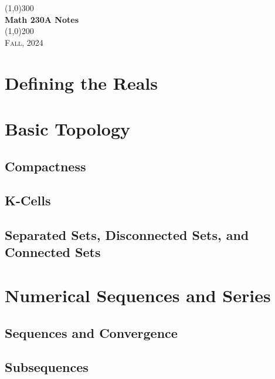 \documentclass[a4paper, openany]{book}
\begin{document}
\begin{titlepage}
    \begin{center}
        \line(1,0){300} \\
        [0.25in]
        \huge{\bfseries Math 230A Notes} \\
        [2mm]
        \line(1,0){200} \\
        [1.5cm]
        \textsc{\LARGE Fall, 2024}
    \end{center}
\end{titlepage}

\tableofcontents
\setcounter{section}{0}

\chapter{Defining the Reals}
\newpage

\chapter{Basic Topology}
\section{Compactness}

\newpage

\section{K-Cells}

\newpage

\section{Separated Sets, Disconnected Sets, and Connected Sets}

\newpage

\chapter{Numerical Sequences and Series}
\section{Sequences and Convergence}

\newpage

\section{Subsequences}

\newpage
\end{document}
